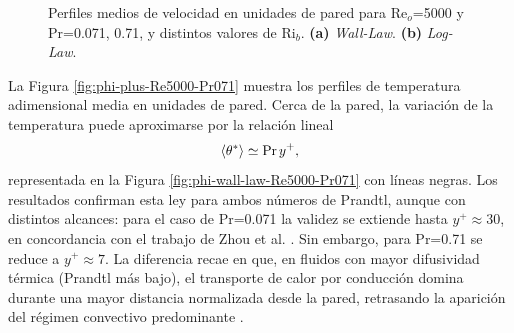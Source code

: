 \begin{figure}[H]
  \centering
    \caption{Perfiles medios de velocidad en unidades de pared para Re$_o$=5000 y Pr=0.071, 0.71, y distintos valores de Ri$_b$. \textbf{(a)} \textit{Wall-Law}. \textbf{(b)} \textit{Log-Law}. }
    \label{fig:ux-plus-Re5000-Pr071}
\end{figure}

La Figura \ref{fig:phi-plus-Re5000-Pr071} muestra los perfiles de temperatura adimensional media en unidades de pared. Cerca de la pared, la variación de la temperatura puede aproximarse por la relación lineal \cite{kawamura1998dns}
\begin{equation*}
\langle \theta^* \rangle \simeq \text{Pr}\hspace{0.5mm} y^+ ,
\end{equation*}
representada en la Figura \ref{fig:phi-wall-law-Re5000-Pr071} con líneas negras. Los resultados confirman esta ley para ambos números de Prandtl, aunque con distintos alcances: para el caso de Pr=0.071 la validez se extiende hasta $y^{+}\approx 30$, en concordancia con el trabajo de Zhou et al. \cite{zhou2024direct}. Sin embargo, para Pr=0.71 se reduce a $y^{+}\approx 7$. La diferencia recae en que, en fluidos con mayor difusividad térmica (Prandtl más bajo), el transporte de calor por conducción domina durante una mayor distancia normalizada desde la pared, retrasando la aparición del régimen convectivo predominante \cite{abregu2023dns}.

